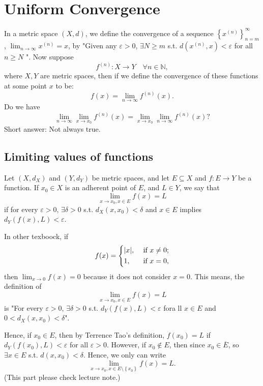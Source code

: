 \chapter{Uniform Convergence}
In a metric space \((X, d)\), we define the convergence of a sequence \(\left\{ x^{(n)} \right\}_{n=m}^{\infty}  \), \(\lim_{n \to \infty} x^{(n)} = x \), by "Given any \(\varepsilon > 0\), \(\exists N \ge m\) s.t. \(d \left( x^{(n)}, x \right) < \varepsilon \) for all \(n \ge N\) ". Now suppose 
\[
    f^{(n)}: X \to Y \quad \forall n \in \mathbb{N},
\] where \(X, Y\) are metric spaces, then if we define the convergence of these functions at some point \(x\) to be: 
\[
    f(x) = \lim_{n \to \infty} f^{(n)}(x).
\] Do we have 
\[
    \lim_{n \to \infty} \lim_{x \to x_0} f^{(n)}(x) = \lim_{x \to x_0} \lim_{n \to \infty} f^{(n)} (x)?    
\]
Short answer: Not always true.
\section{Limiting values of functions}
\begin{definition}
    Let \((X, d_X)\) and \((Y, d_Y)\) be metric spaces, and let \(E \subseteq X\) and \(f:E \to Y\) be a function. If \(x_0 \in X\) is an adherent point of \(E\), and \(L \in Y\), we say that 
    \[
        \lim_{x \to x_0, x \in E} f(x) = L  
    \] if for every \(\varepsilon > 0\), \(\exists \delta > 0\) s.t. \(d_X (x, x_0) < \delta \) and \(x \in E\) implies \(d_Y \left( f(x), L \right) < \varepsilon  \).            
\end{definition}

\begin{remark}
    In other texboock, if 
    \[
        f(x) = \begin{dcases}
            \vert x \vert , &\text{ if }  x \neq 0;\\
            1, &\text{ if }  x = 0,
        \end{dcases}
    \] then \(\lim_{x \to 0} f(x) = 0\) because it does not consider \(x = 0\). This means, the definition of
    \[
        \lim_{x \to x_0, x \in E} f(x) = L
    \]
    is "For every \(\varepsilon > 0\), \(\exists \delta > 0\) s.t. \(d_Y \left( f(x), L \right) < \varepsilon  \) fora ll \(x \in E\) and \(0 < d_X (x, x_0) < \delta \)". 
    
    Hence, if \(x_0 \in E\), then by Terrence Tao's definition, \(f(x_0) = L\) if \(d_Y \left( f(x_0), L \right) < \varepsilon  \) for all \(\varepsilon > 0\). However, if \(x_0 \notin E\), then since \(x_0 \in \overline{E} \), so \(\exists x \in E\) s.t. \(d(x, x_0) < \delta \). Hence, we only can write 
    \[
        \lim_{x \to x_0, x \in E \setminus \left\{ x_0 \right\} } f(x) = L. 
    \]
    (This part please check lecture note.)       
\end{remark}

